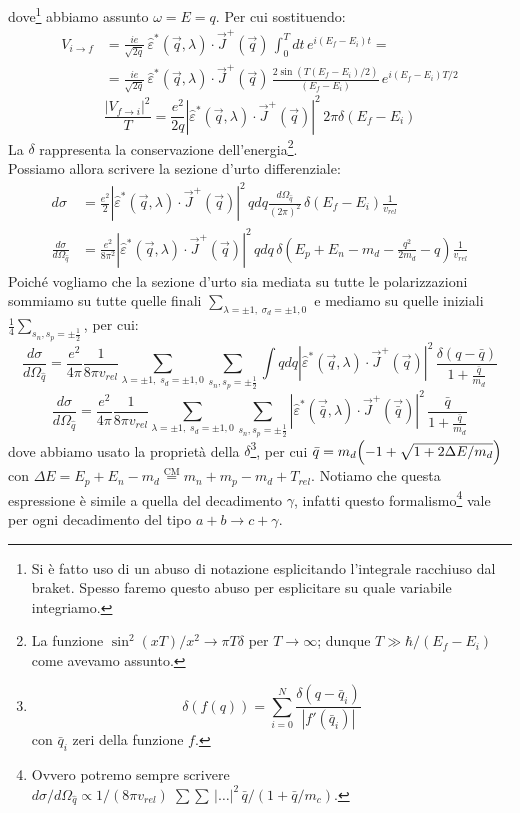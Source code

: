 dove\footnote{Si è fatto uso di un abuso di notazione esplicitando l'integrale racchiuso dal braket. Spesso faremo questo abuso per esplicitare su quale variabile integriamo.} abbiamo assunto $\omega = E = q$. Per cui sostituendo:
\begin{align*}
    V_{i\to f} &= \frac{ie}{\sqrt{2q}}\,\widehat{\varepsilon}^*(\vec{q},\lambda) \cdot \vec{J}^+(\vec{q})\, \int_0^T dt \, e^{i(E_f-E_i)t} = \\
    &= \frac{ie}{\sqrt{2q}}\,\widehat{\varepsilon}^*(\vec{q},\lambda) \cdot \vec{J}^+(\vec{q})\,\frac{2\sin{(T (E_f-E_i)/2)}}{(E_f-E_i)} \, e^{i(E_f-E_i)T/2}
\end{align*}
$$\frac{|V_{f\to i}|^2}{T} = \frac{e^2}{2q} |\widehat{\varepsilon}^*(\vec{q},\lambda) \cdot \vec{J}^+(\vec{q})|^2\, 2\pi \delta(E_f - E_i)$$
La $\delta$ rappresenta la conservazione dell'energia\footnote{La funzione $\sin^2(xT)/x^2 \to \pi T \delta$ per $T\to\infty$; dunque $T\gg \hbar/(E_f-E_i)$ come avevamo assunto.}.\\
Possiamo allora scrivere la sezione d'urto differenziale:
\begin{displaymath}
\begin{aligned}
d\sigma &= \frac{e^2}{2} |\widehat{\varepsilon}^*(\vec{q},\lambda) \cdot \vec{J}^+(\vec{q})|^2\, q dq \frac{d\Omega_{\hat{q}}}{(2\pi)^2}\, \delta(E_f - E_i) \frac{1}{v_{rel}} \\
\frac{d\sigma}{d\Omega_{\hat{q}}} &= \frac{e^2}{8\pi^2} |\widehat{\varepsilon}^*(\vec{q},\lambda) \cdot \vec{J}^+(\vec{q})|^2\, q dq \, \delta(E_p + E_n - m_d - \frac{q^2}{2m_d}-q) \frac{1}{v_{rel}}
\end{aligned}
\end{displaymath}
Poiché vogliamo che la sezione d'urto sia mediata su tutte le polarizzazioni sommiamo su tutte quelle finali $\sum_{\lambda=\pm 1 ,\; \sigma_d = \pm 1, 0}$ e mediamo su quelle iniziali $\frac{1}{4}\sum_{s_n,s_p = \pm \frac{1}{2}}$, per cui:
$$\frac{d\sigma}{d\Omega_{\hat{q}}} = \frac{e^2}{4\pi}\frac{1}{8\pi v_{rel}}\sum_{\lambda=\pm 1 ,\; s_d = \pm 1, 0} \sum_{s_n,s_p = \pm \frac{1}{2}} \int q dq |\widehat{\varepsilon}^*(\vec{q},\lambda) \cdot \vec{J}^+(\vec{q})|^2\,\frac{\delta (q-\bar{q})}{1+\frac{\bar{q}}{m_d}}$$
$$\frac{d\sigma}{d\Omega_{\hat{q}}}=\frac{e^2}{4\pi}\frac{1}{8\pi v_{rel}}\sum_{\lambda=\pm 1 ,\; s_d = \pm 1, 0} \sum_{s_n,s_p = \pm \frac{1}{2}}  |\widehat{\varepsilon}^*(\vec{\bar{q}},\lambda) \cdot \vec{J}^+(\vec{\bar{q}})|^2\,\frac{\bar{q}}{1+\frac{\bar{q}}{m_d}}$$
dove abbiamo usato la proprietà della $\delta$\footnote{$$\delta (f(q)) = \sum_{i=0}^N\frac{\delta(q-\bar{q}_i)}{|f'(\bar{q}_i)|}$$
con $\bar{q}_i$ zeri della funzione $f$.}, per cui $\bar{q} = m_d \Bigl ( -1+ \sqrt{1+2\Delta E/m_d} \Bigr )$ con $\Delta E = E_p + E_n - m_d \overset{\text{CM}}{=} m_n+m_p-m_d + T_{rel}$. Notiamo che questa espressione è simile a quella del decadimento $\gamma$, infatti questo formalismo\footnote{Ovvero potremo sempre scrivere ${d\sigma}/{d\Omega_{\hat{q}}} \propto 1/(8\pi v_{rel})\; \sum \sum \, |\dots|^2\, {\bar{q}}/{(1+\bar{q}/m_c)}$.} vale per ogni decadimento del tipo $a+b\to c +\gamma$.\\
